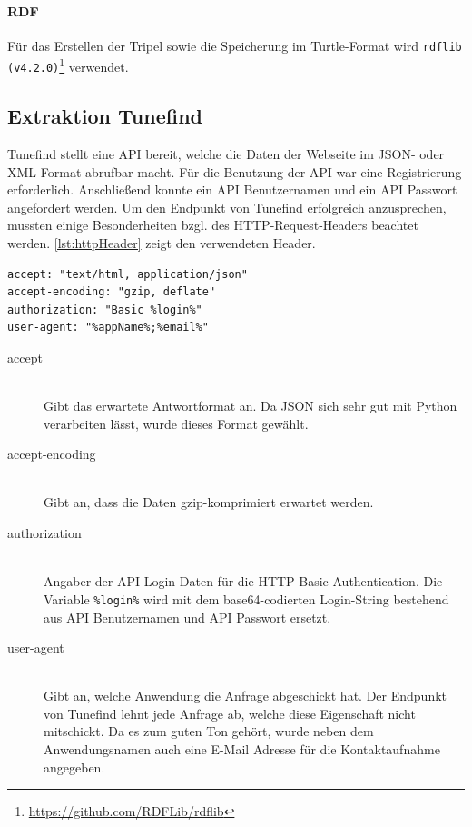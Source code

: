 \documentclass[parskip]{scrartcl}
\begin{document}
\paragraph{RDF}
Für das Erstellen der Tripel sowie die Speicherung im Turtle-Format wird \texttt{rdflib (v4.2.0)}\footnote{\href{https://github.com/RDFLib/rdflib}{https://github.com/RDFLib/rdflib}} verwendet. 

\subsection{Extraktion Tunefind}

Tunefind stellt eine API bereit, welche die Daten der Webseite im JSON- oder XML-Format abrufbar macht. Für die Benutzung der API war eine Registrierung erforderlich. Anschließend konnte ein API Benutzernamen und ein API Passwort angefordert werden.
Um den Endpunkt von Tunefind erfolgreich anzusprechen, mussten einige Besonderheiten bzgl. des HTTP-Request-Headers beachtet werden. \autoref{lst:httpHeader} zeigt den verwendeten Header.

\begin{lstlisting}[caption={HTTP-Request-Header}, label={lst:httpHeader}]
accept: "text/html, application/json"
accept-encoding: "gzip, deflate"
authorization: "Basic %login%"
user-agent: "%appName%;%email%"
\end{lstlisting}

\begin{description}
    \item[accept] \hfill \\
        Gibt das erwartete Antwortformat an. Da JSON sich sehr gut mit Python verarbeiten lässt, wurde dieses Format gewählt.
    \item[accept-encoding] \hfill \\
        Gibt an, dass die Daten gzip-komprimiert erwartet werden.
    \item[authorization] \hfill \\
        Angaber der API-Login Daten für die HTTP-Basic-Authentication.
        Die Variable \texttt{\%login\%} wird mit dem base64-codierten Login-String bestehend aus API Benutzernamen und API Passwort ersetzt.
    \item[user-agent] \hfill \\
        Gibt an, welche Anwendung die Anfrage abgeschickt hat. Der Endpunkt von Tunefind lehnt jede Anfrage ab, welche diese Eigenschaft nicht mitschickt. Da es zum guten Ton gehört, wurde neben dem Anwendungsnamen auch eine E-Mail Adresse für die Kontaktaufnahme angegeben.
\end{description}
\end{document}
